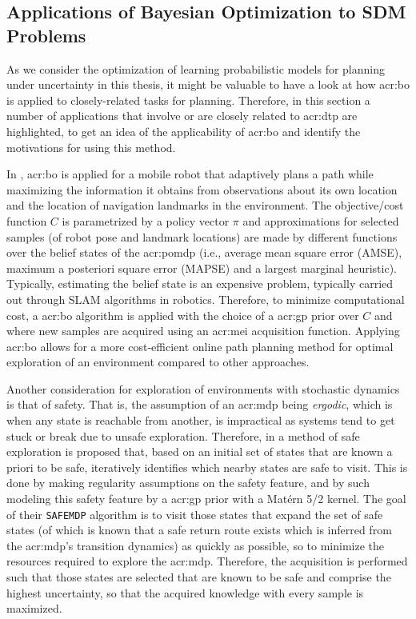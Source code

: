 \subsection{Applications of Bayesian Optimization to SDM Problems}
\label{sec:bayesian-optimization-applications}

As we consider the optimization of learning probabilistic models for planning under uncertainty in this thesis, it might be valuable to have a look at how \acrlong{acr:bo} is applied to closely-related tasks for planning.
Therefore, in this section a number of applications that involve or are closely related to \acrshort{acr:dtp} are highlighted, to get an idea of the applicability of \acrlong{acr:bo} and identify the motivations for using this method.

In \cite{MartinezCantin2009}, \acrlong{acr:bo} is applied for a mobile robot that adaptively plans a path while maximizing the information it obtains from observations about its own location and the location of navigation landmarks in the environment.
The objective/cost function $C$ is parametrized by a policy vector $\pi$ and approximations for selected samples (of robot pose and landmark locations) are made by different functions over the belief states of the \acrshort{acr:pomdp} (i.e., average mean square error (AMSE), maximum a posteriori square error (MAPSE) and a largest marginal heuristic).
Typically, estimating the belief state is an expensive problem, typically carried out through SLAM algorithms in robotics.
Therefore, to minimize computational cost, a \acrlong{acr:bo} algorithm is applied with the choice of a \acrshort{acr:gp} prior over $C$ and where new samples are acquired using an \acrshort{acr:mei} acquisition function.
Applying \acrlong{acr:bo} allows for a more cost-efficient online path planning method for optimal exploration of an environment compared to other approaches.

Another consideration for exploration of environments with stochastic dynamics is that of safety. That is, the assumption of an \acrshort{acr:mdp} being \textit{ergodic}, which is when any state is reachable from another, is impractical as systems tend to get stuck or break due to unsafe exploration. 
Therefore, in \cite{turchetta2016safe} a method of safe exploration is proposed that, based on an initial set of states that are known a priori to be safe, iteratively identifies which nearby states are safe to visit.
This is done by making regularity assumptions on the safety feature, and by such modeling this safety feature by a \acrshort{acr:gp} prior with a Mat\'ern 5/2 kernel.
The goal of their \texttt{SAFEMDP} algorithm is to visit those states that expand the set of safe states (of which is known that a safe return route exists which is inferred from the \acrshort{acr:mdp}'s transition dynamics) as quickly as possible, so to minimize the resources required to explore the \acrshort{acr:mdp}.
Therefore, the acquisition is performed such that those states are selected that are known to be safe and comprise the highest uncertainty, so that the acquired knowledge with every sample is maximized.


